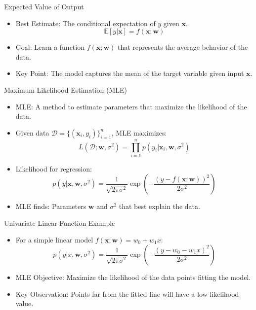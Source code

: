 \documentclass[serif, aspectratio=169]{beamer}
\begin{document}
\begin{frame}{Expected Value of Output}
    \begin{itemize}
        \item Best Estimate: The conditional expectation of \( y \) given \( \mathbf{x} \).
        \[
        \mathbb{E}[y | \mathbf{x}] = f(\mathbf{x}; \mathbf{w})
        \]
        \item Goal: Learn a function \( f(\mathbf{x}; \mathbf{w}) \) that represents the average behavior of the data.
        \item Key Point: The model captures the mean of the target variable given input \( \mathbf{x} \).
    \end{itemize}
\end{frame}

\begin{frame}{Maximum Likelihood Estimation (MLE)}
    \begin{itemize}
        \item MLE: A method to estimate parameters that maximize the likelihood of the data.
        \item Given data \( \mathcal{D} = \{ (\mathbf{x}_i, y_i) \}_{i=1}^n \), MLE maximizes:
        \[
        L(\mathcal{D}; \mathbf{w}, \sigma^2) = \prod_{i=1}^n p(y_i | \mathbf{x}_i, \mathbf{w}, \sigma^2)
        \]
        \item Likelihood for regression:
        \[
        p(y | \mathbf{x}, \mathbf{w}, \sigma^2) = \frac{1}{\sqrt{2\pi \sigma^2}} \exp \left( - \frac{(y - f(\mathbf{x}; \mathbf{w}))^2}{2\sigma^2} \right)
        \]
        \item MLE finds: Parameters \( \mathbf{w} \) and \( \sigma^2 \) that best explain the data.
    \end{itemize}
\end{frame}

\begin{frame}{Univariate Linear Function Example}
    \begin{itemize}
        \item For a simple linear model \( f(\mathbf{x}; \mathbf{w}) = w_0 + w_1 x \):
        \[
        p(y | x, \mathbf{w}, \sigma^2) = \frac{1}{\sqrt{2\pi \sigma^2}} \exp \left( - \frac{(y - w_0 - w_1 x)^2}{2\sigma^2} \right)
        \]
        \item MLE Objective: Maximize the likelihood of the data points fitting the model.
        \item Key Observation: Points far from the fitted line will have a low likelihood value.
    \end{itemize}
\end{frame}
\end{document}
